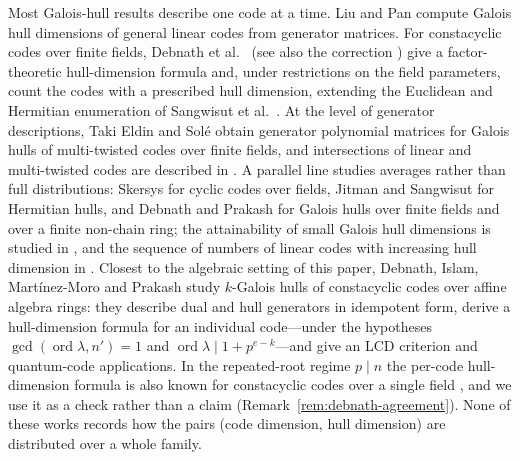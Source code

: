 Most Galois-hull results describe one code at a time. Liu and Pan
\cite{liuPan2020} compute Galois hull dimensions of general linear codes from
generator matrices. For constacyclic codes over finite fields, Debnath et
al.\ \cite{debnathConstacyclic2023} (see also the correction
\cite{debnathCorrection2023}) give a factor-theoretic hull-dimension
formula and, under restrictions on the field parameters, count the codes
with a prescribed hull dimension, extending the Euclidean and Hermitian
enumeration of Sangwisut et al.\ \cite{sangwisut2015}. At the level of
generator descriptions, Taki Eldin and Sol\'e \cite{eldinSole2026} obtain
generator polynomial matrices for Galois hulls of multi-twisted codes over
finite fields, and intersections of linear and multi-twisted codes are
described in \cite{eldinLeroy2026}. A parallel line studies averages rather than full
distributions: Skersys \cite{skersys2003} for cyclic codes over fields,
Jitman and Sangwisut \cite{jitmanSangwisut2018} for Hermitian hulls, and
Debnath and Prakash \cite{debnathAverage2025} for Galois hulls over finite
fields and over a finite non-chain ring; the attainability of small Galois
hull dimensions is studied in \cite{debnathSmall2026}, and the sequence of
numbers of linear codes with increasing hull dimension in
\cite{bouyuklieva2026}. Closest to the
algebraic setting of this paper, Debnath, Islam, Mart\'inez-Moro and Prakash
\cite{debnathAffine2026} study $k$-Galois hulls of constacyclic codes over
affine algebra rings: they describe dual and hull generators in idempotent
form, derive a hull-dimension formula for an individual code---under the
hypotheses $\gcd(\operatorname{ord}\lambda,n')=1$ and
$\operatorname{ord}\lambda\mid 1+p^{e-k}$---and give an LCD criterion and
quantum-code applications. In the repeated-root regime $p\mid n$ the
per-code hull-dimension formula is also known for constacyclic codes over a
single field \cite{debnathConstacyclic2023}, and we use it as a check rather
than a claim (Remark~\ref{rem:debnath-agreement}). None of these works
records how the pairs (code dimension, hull dimension) are distributed over
a whole family.

